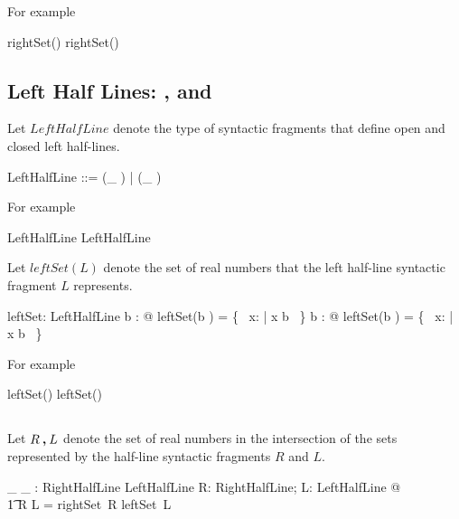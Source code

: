 \documentclass[11pt, oneside]{article}
\begin{document}
For example

\begin{zed}
	\zeroR \notin rightSet(\openLowerBound \zeroR)
\also
	\oneR \in rightSet(\closedLowerBound \oneR)
\end{zed}

\subsection{Left Half Lines: , and }

Let $LeftHalfLine$ denote the type of syntactic fragments that define open and closed left half-lines.

\begin{zed}
	LeftHalfLine ::= (\_ \openUpperBound)  \ldata \R \rdata | (\_ \closedUpperBound)  \ldata \R \rdata
\end{zed}

For example

\begin{zed}
	\zeroR \openUpperBound \in LeftHalfLine
\also
	\oneR \closedUpperBound \in LeftHalfLine
\end{zed}

Let $leftSet(L)$ denote the set of real numbers that the left half-line syntactic fragment $L$ represents.

\begin{axdef}
	leftSet: LeftHalfLine \fun \power \R
\where
	\forall b : \R @ leftSet(b \openUpperBound) = \{~ x: \R | x \ltR b ~\}
\also
	\forall b : \R @ leftSet(b \closedUpperBound) = \{~ x: \R | x \leR b ~\}
\end{axdef}

For example

\begin{zed}
	\zeroR \notin leftSet(\zeroR \openUpperBound)
\also
	\oneR \in leftSet(\oneR \closedUpperBound)
\end{zed}

\subsection{}

Let $R \mathbin{\boldsymbol{,}} L$ denote the set of real numbers in the intersection of the sets represented by
the half-line syntactic fragments $R$ and $L$.

\begin{axdef}
	\_ \intersectRightLeft \_ : RightHalfLine \cross LeftHalfLine \fun \power \R
\where
	\forall R: RightHalfLine; L: LeftHalfLine @ \\
	\t1	R \intersectRightLeft L = rightSet~R \cap leftSet~L
\end{axdef}
\end{document}
